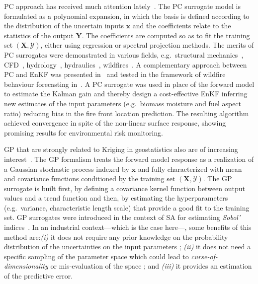 PC approach has received much attention lately~\citep{dubreuil2014,sudret2008,xiu2010,xiu2002,Ciriello2013}. The PC surrogate model is formulated as a polynomial expansion, in which the basis is defined according to the distribution of the uncertain inputs $\mathbf{x}$ and the coefficients relate to the statistics of the output $\mathbf{Y}$. The coefficients are computed so as to fit the training set $(\mathbf{X}, \mathcal{Y})$, either using regression or spectral projection methods. The merits of PC surrogates were demonstrated in various fields, e.g.~structural mechanics~\citep{dubreuil2014,berveiller2005}, CFD~\citep{hosder2006,lucor2007,saad2007phd}, hydrology~\citep{deman2015}, hydraulics~\citep{ge2008,elmocaydphd}, wildfires~\citep{rochoux2014}. A complementary approach between PC and EnKF was presented in~\citet{lixiu2009} and tested in the framework of wildfire behaviour forecasting in~\citet{rochoux2014}. A PC surrogate was used in place of the forward model to estimate the Kalman gain and thereby design a cost-effective EnKF inferring new estimates of the input parameters (e.g.~biomass moisture and fuel aspect ratio) reducing bias in the fire front location prediction. The resulting algorithm achieved convergence in spite of the non-linear surface response, showing promising results for environmental risk monitoring. 

GP that are strongly related to Kriging in geostatistics also are of increasing interest~\citep{rasmussen2006,legratiet2017,lockwood2012,marrel2015}. The GP formalism treats the forward model response as a realization of a Gaussian stochastic process indexed by $\mathbf{x}$ and fully characterized with mean and covariance functions conditioned by the training set $(\mathbf{X}, \mathcal{Y})$. The GP surrogate is built first, by defining a covariance kernel function between output values and a trend function and then, by estimating the hyperparameters (e.g.~variance, characteristic length scale) that provide a good fit to the training set. GP surrogates were introduced in the context of SA for estimating \emph{Sobol'} indices~\citep{oakley2004,marrel2009,legratiet2014}. In an industrial context---which is the case here---, some benefits of this method are:\textit{(i)} it does not require any prior knowledge on the probability distribution of the uncertainties on the input parameters ; \textit{(ii)} it does not need a specific sampling of the parameter space which could lead to \textit{curse-of-dimensionality} or mis-evaluation of the space ; and \textit{(iii)} it provides an estimation of the predictive error.

